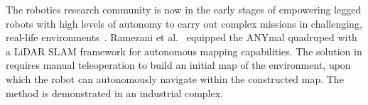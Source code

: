\documentclass[letterpaper, 10pt, conference]{ieeeconf}      %
\newcommand{\rev}[1]{{\color{blue}#1}} %
\begin{document}

The robotics research community is now in the early stages of empowering legged robots with high levels of autonomy to carry out complex missions in challenging, real-life environments~\cite{Delmerico2019}. Ramezani et al.~\cite{Ramezani2020} equipped the ANYmal quadruped with a LiDAR SLAM framework for autonomous mapping capabilities. The solution in \cite{Ramezani2020} requires manual teleoperation to build an initial map of the environment, upon which the robot can autonomously navigate within the constructed map. The method is demonstrated in an industrial complex.
\end{document}
